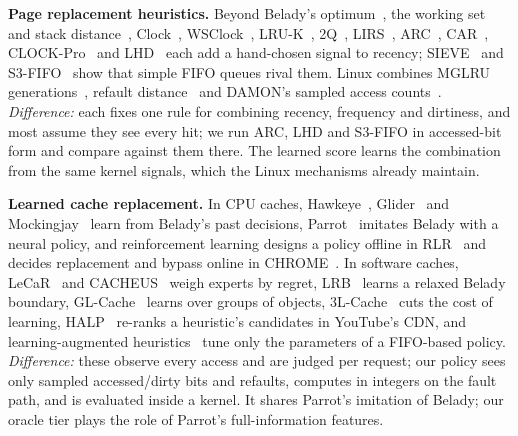 \documentclass{article}
\newcommand{\clock}{Clock\xspace}
\newcommand{\belady}{Belady\xspace}
\newcommand{\finding}[1]{\textbf{#1}\hspace{0.4em}}
\begin{document}
\finding{Page replacement heuristics.} Beyond \belady's
optimum~\citep{belady1966study}, the working set~\citep{denning1968working} and stack
distance~\citep{mattson1970evaluation}, \clock~\citep{corbato1968paging},
WSClock~\citep{carr1981wsclock},
LRU-K~\citep{oneil1993lruk}, 2Q~\citep{johnson1994twoq}, LIRS~\citep{jiang2002lirs},
ARC~\citep{megiddo2003arc}, CAR~\citep{bansal2004car},
CLOCK-Pro~\citep{jiang2005clockpro} and LHD~\citep{beckmann2018lhd} each add a
hand-chosen signal to recency; SIEVE~\citep{zhang2024sieve} and
S3-FIFO~\citep{yang2023s3fifo} show that simple FIFO queues rival them. Linux combines
MGLRU generations~\citep{linux_mglru}, refault distance~\citep{linux_workingset} and
DAMON's sampled access counts~\citep{linux_damon}.
\emph{Difference:} each fixes one rule for combining recency, frequency and dirtiness, and
most assume they see every hit; we run ARC, LHD and S3-FIFO in accessed-bit form and
compare against them there. The learned score learns the combination from the same
kernel signals, which the Linux mechanisms already maintain.

\finding{Learned cache replacement.} In CPU caches, Hawkeye~\citep{jain2016hawkeye},
Glider~\citep{shi2019glider} and Mockingjay~\citep{shah2022mockingjay} learn from
\belady's past decisions, Parrot~\citep{liu2020parrot} imitates \belady with a neural
policy, and reinforcement learning designs a policy offline in
RLR~\citep{sethumurugan2021rlr} and decides replacement and bypass online in
CHROME~\citep{lu2024chrome}. In software caches, LeCaR~\citep{vietri2018lecar} and
CACHEUS~\citep{rodriguez2021cacheus} weigh experts by regret, LRB~\citep{song2020lrb}
learns a relaxed \belady boundary, GL-Cache~\citep{yang2023glcache} learns over groups
of objects, 3L-Cache~\citep{zhou2025threelcache} cuts the cost of learning,
HALP~\citep{song2023halp} re-ranks a heuristic's candidates in YouTube's CDN, and
learning-augmented heuristics~\citep{xia2026lah} tune only the parameters of a FIFO-based
policy. \emph{Difference:} these observe every access and are judged per request; our
policy sees only sampled accessed/dirty bits and refaults, computes in integers on the
fault path, and is evaluated inside a kernel. It shares Parrot's imitation of \belady;
our oracle tier plays the role of Parrot's full-information features.
\end{document}
